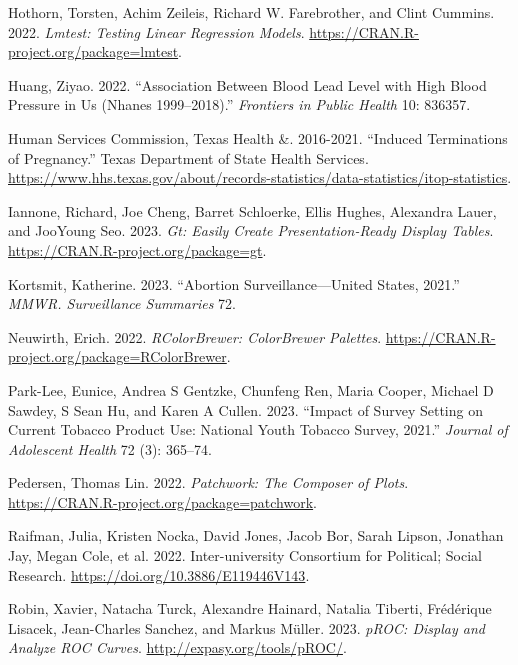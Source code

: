 \documentclass[
  letterpaper,
]{krantz}
\newlength{\cslhangindent}
\newlength{\cslentryspacingunit} %
\newenvironment{CSLReferences}[2] %
 {%
  \setlength{\parindent}{0pt}
  \ifodd #1
  \let\oldpar\par
  \def\par{\hangindent=\cslhangindent\oldpar}
  \fi
  \setlength{\parskip}{#2\cslentryspacingunit}
 }%
 {}
\begin{document}
\begin{CSLReferences}{1}{0}
\leavevmode{}%
Hothorn, Torsten, Achim Zeileis, Richard W. Farebrother, and Clint
Cummins. 2022. \emph{Lmtest: Testing Linear Regression Models}.
\url{https://CRAN.R-project.org/package=lmtest}.

\leavevmode{}%
Huang, Ziyao. 2022. {``Association Between Blood Lead Level with High
Blood Pressure in Us (Nhanes 1999--2018).''} \emph{Frontiers in Public
Health} 10: 836357.

\leavevmode{}%
Human Services Commission, Texas Health \&. 2016-2021. {``Induced
Terminations of Pregnancy.''} Texas Department of State Health Services.
\url{https://www.hhs.texas.gov/about/records-statistics/data-statistics/itop-statistics}.

\leavevmode{}%
Iannone, Richard, Joe Cheng, Barret Schloerke, Ellis Hughes, Alexandra
Lauer, and JooYoung Seo. 2023. \emph{Gt: Easily Create
Presentation-Ready Display Tables}.
\url{https://CRAN.R-project.org/package=gt}.

\leavevmode{}%
Kortsmit, Katherine. 2023. {``Abortion Surveillance---United States,
2021.''} \emph{MMWR. Surveillance Summaries} 72.

\leavevmode{}%
Neuwirth, Erich. 2022. \emph{RColorBrewer: ColorBrewer Palettes}.
\url{https://CRAN.R-project.org/package=RColorBrewer}.

\leavevmode{}%
Park-Lee, Eunice, Andrea S Gentzke, Chunfeng Ren, Maria Cooper, Michael
D Sawdey, S Sean Hu, and Karen A Cullen. 2023. {``Impact of Survey
Setting on Current Tobacco Product Use: National Youth Tobacco Survey,
2021.''} \emph{Journal of Adolescent Health} 72 (3): 365--74.

\leavevmode{}%
Pedersen, Thomas Lin. 2022. \emph{Patchwork: The Composer of Plots}.
\url{https://CRAN.R-project.org/package=patchwork}.

\leavevmode{}%
Raifman, Julia, Kristen Nocka, David Jones, Jacob Bor, Sarah Lipson,
Jonathan Jay, Megan Cole, et al. 2022. Inter-university Consortium for
Political; Social Research. \url{https://doi.org/10.3886/E119446V143}.

\leavevmode{}%
Robin, Xavier, Natacha Turck, Alexandre Hainard, Natalia Tiberti,
Frédérique Lisacek, Jean-Charles Sanchez, and Markus Müller. 2023.
\emph{pROC: Display and Analyze ROC Curves}.
\url{http://expasy.org/tools/pROC/}.


\end{CSLReferences}
\end{document}
